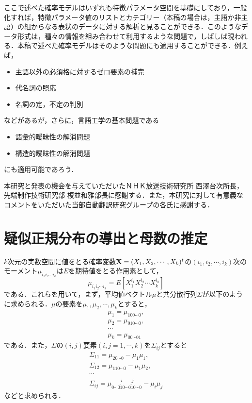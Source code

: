 ここで述べた確率モデルはいずれも特徴パラメータ空間を基礎にしており，一般化すれば，特徴パラメータ値のリストとカテゴリー（本稿の場合は，主語か非主語）の組からなる表状のデータに対する解析と見ることができる．このようなデータ形式は，種々の情報を組み合わせて利用するような問題で，しばしば現われる．本稿で述べた確率モデルはそのような問題にも適用することができる．例えば，
\begin{itemize}
\item 主語以外の必須格に対するゼロ要素の補完
\item 代名詞の照応
\item 名詞の定，不定の判別
\end{itemize}
などがあるが，さらに，言語工学の基本問題である
\begin{itemize}
\item 語彙的曖昧性の解消問題
\item 構造的曖昧性の解消問題
\end{itemize}
にも適用可能であろう．

\acknowledgment

本研究と発表の機会を与えていただいたＮＨＫ放送技術研究所 西澤台次所長，先端制作技術研究部 榎並和雅部長に感謝する．また，本研究に対して有意義なコメントをいただいた当部自動翻訳研究グループの各氏に感謝する．


\appendix
\section{疑似正規分布の導出と母数の推定} \label{app:疑似正規分布}

$k$次元の実数空間に値をとる確率変数${\bf X}=(X_{1},X_{2},\cdots,X_{k})^{t}$の$(i_{1},i_{2},\cdots,i_{k})$次のモーメント$\mu_{i_{1}i_{2}\cdots i_{k}}$は$E$を期待値をとる作用素として，
\begin{equation}
 \mu_{i_{1}i_{2}\cdots i_{k}}=
   E[X_{1}^{i_{1}}X_{2}^{i_{2}} \cdots X_{k}^{i_{k}}]
\end{equation}
である．これらを用いて，まず，平均値ベクトル$\mu$と共分散行列$\Sigma$が以下のように求められる．$\mu$の要素を$\mu_{1},\mu_{2},\cdots,\mu_{k}$とすると，
\begin{equation}
 \begin{array}{ll}
 \mu_{1} = \mu_{100 \cdots 0}, \\
 \mu_{2} = \mu_{010 \cdots 0}, \\
 　　　\cdots  \\
 \mu_{k} = \mu_{00 \cdots 01}
 \end{array}
\end{equation}
である．また，$\Sigma$の$(i,j)$要素$(i,j=1, \cdots ,k)$を$\Sigma_{ij}$とすると
\begin{equation}
 \begin{array}{ll}
 \Sigma_{11} = \mu_{20 \cdots 0} - \mu_{1} \mu_{1},  \\
 \Sigma_{12} = \mu_{110 \cdots 0} - \mu_{1} \mu_{2},  \\
 　　　\cdots  \\
 \Sigma_{ij} = \mu_{0 \cdots 0 \breve{1} 0 \cdots 0 \breve{1} 0 
   \cdots 0}^{\; \; \; \; \; \; \; i \; \; \; \; \; \; \; j } 
    - \mu_{i} \mu_{j}
 \end{array}
\end{equation}
などと求められる．

